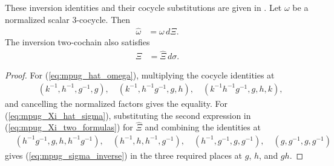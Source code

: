 \begin{lemma}
    \label{thm:mpug_omega_Xi}
    \leanok
    These inversion identities and their cocycle substitutions are given in
    \cite[lines~5967--5979]{FrancoRubio2025MPUGauging}.
    Let $\omega$ be a normalized scalar $3$-cocycle. Then
    \begin{align}
        \widehat\omega & =\omega\,d\Xi.
        \label{eq:mpug_hat_omega}
    \end{align}
    The inversion two-cochain also satisfies
    \begin{align}
        \Xi & =\widehat\Xi\,d\sigma.
        \label{eq:mpug_Xi_hat_sigma}
    \end{align}
\end{lemma}
\begin{proof}\leanok
    For (\ref{eq:mpug_hat_omega}), multiplying the cocycle identities at
    \begin{align}
         & (k^{-1},h^{-1},g^{-1},g),\quad
        (k^{-1},h^{-1}g^{-1},g,h),\quad
        (k^{-1}h^{-1}g^{-1},g,h,k),
    \end{align}
    and cancelling the normalized factors gives the equality. For
    (\ref{eq:mpug_Xi_hat_sigma}), substituting the second expression in
    (\ref{eq:mpug_Xi_two_formulas}) for $\widehat\Xi$ and combining the
    identities at
    \begin{align}
         & (h^{-1}g^{-1},g,h,h^{-1}g^{-1}),\quad
        (h^{-1},h,h^{-1},g^{-1}),\quad
        (h^{-1},g^{-1},g,g^{-1}),\quad
        (g,g^{-1},g,g^{-1})
    \end{align}
    gives (\ref{eq:mpug_sigma_inverse}) in the three required places at $g$,
    $h$, and $gh$.
\end{proof}

